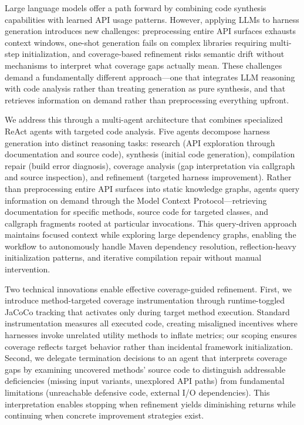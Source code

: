 \documentclass[sigconf,review,anonymous]{acmart}
\begin{document}
Large language models offer a path forward by combining code synthesis capabilities with learned API usage patterns. However, applying LLMs to harness generation introduces new challenges: preprocessing entire API surfaces exhausts context windows, one-shot generation fails on complex libraries requiring multi-step initialization, and coverage-based refinement risks semantic drift without mechanisms to interpret what coverage gaps actually mean. These challenges demand a fundamentally different approach—one that integrates LLM reasoning with code analysis rather than treating generation as pure synthesis, and that retrieves information on demand rather than preprocessing everything upfront.

We address this through a multi-agent architecture that combines specialized ReAct agents with targeted code analysis. Five agents decompose harness generation into distinct reasoning tasks: research (API exploration through documentation and source code), synthesis (initial code generation), compilation repair (build error diagnosis), coverage analysis (gap interpretation via callgraph and source inspection), and refinement (targeted harness improvement). Rather than preprocessing entire API surfaces into static knowledge graphs, agents query information on demand through the Model Context Protocol—retrieving documentation for specific methods, source code for targeted classes, and callgraph fragments rooted at particular invocations. This query-driven approach maintains focused context while exploring large dependency graphs, enabling the workflow to autonomously handle Maven dependency resolution, reflection-heavy initialization patterns, and iterative compilation repair without manual intervention.

Two technical innovations enable effective coverage-guided refinement. First, we introduce method-targeted coverage instrumentation through runtime-toggled JaCoCo tracking that activates only during target method execution. Standard instrumentation measures all executed code, creating misaligned incentives where harnesses invoke unrelated utility methods to inflate metrics; our scoping ensures coverage reflects target behavior rather than incidental framework initialization. Second, we delegate termination decisions to an agent that interprets coverage gaps by examining uncovered methods' source code to distinguish addressable deficiencies (missing input variants, unexplored API paths) from fundamental limitations (unreachable defensive code, external I/O dependencies). This interpretation enables stopping when refinement yields diminishing returns while continuing when concrete improvement strategies exist.
\end{document}
